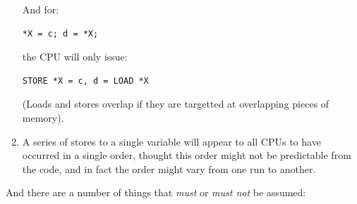 \begin{enumerate}
	And for:

\vspace{5pt}
\begin{minipage}[t]{\columnwidth}
\small
\begin{verbatim}
*X = c; d = *X;
\end{verbatim}
\end{minipage}
\vspace{5pt}

	the CPU will only issue:

\vspace{5pt}
\begin{minipage}[t]{\columnwidth}
\small
\begin{verbatim}
STORE *X = c, d = LOAD *X
\end{verbatim}
\end{minipage}
\vspace{5pt}

	(Loads and stores overlap if they are targetted at overlapping pieces of
	memory).
\item	A series of stores to a single variable will appear to all
	CPUs to have occurred in a single order, thought this order
	might not be predictable from the code, and in fact the
	order might vary from one run to another.
\end{enumerate}

And there are a number of things that \emph{must} or \emph{must not} be assumed:

